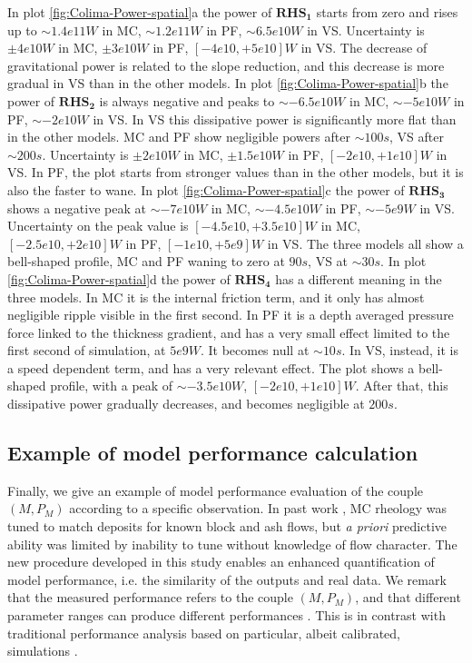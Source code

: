 \documentclass{article}
\begin{document}
In plot \ref{fig:Colima-Power-spatial}a the power of $\boldsymbol{RHS_1}$ starts from zero and rises up to $\sim 1.4e11 W$ in MC, $\sim 1.2e11 W$ in PF, $\sim 6.5e10 W$ in VS. Uncertainty is $\pm 4e10 W$ in MC, $\pm 3e10 W$ in PF, $[-4e10,+5e10] W$ in VS. The decrease of gravitational power is related to the slope reduction, and this decrease is more gradual in VS than in the other models. In plot \ref{fig:Colima-Power-spatial}b the power of  $\boldsymbol{RHS_2}$ is always negative and peaks to $\sim -6.5e10 W$ in MC, $\sim -5e10 W$ in PF, $\sim -2e10 W$ in VS. In VS this dissipative power is significantly more flat than in the other models. MC and PF show negligible powers after $\sim 100 s$, VS after $\sim 200 s$. Uncertainty is $\pm 2e10 W$ in MC, $\pm 1.5e10 W$ in PF, $[-2e10,+1e10] W$ in VS. In PF, the plot starts from stronger values than in the other models, but it is also the faster to wane. In plot \ref{fig:Colima-Power-spatial}c the power of $\boldsymbol{RHS_3}$ shows a negative peak at $\sim -7e10 W$ in MC, $\sim -4.5e10 W$ in PF, $\sim -5e9 W$ in VS. Uncertainty on the peak value is $[-4.5e10,+3.5e10] W$ in MC, $[-2.5e10,+2e10] W$ in PF, $[-1e10,+5e9] W$ in VS. The three models all show a bell-shaped profile, MC and PF waning to zero at $90 s$, VS at $\sim 30 s$. In plot \ref{fig:Colima-Power-spatial}d the power of $\boldsymbol{RHS_4}$ has a different meaning in the three models. In MC it is the internal friction term, and it only has almost negligible ripple visible in the first second. In PF it is a depth averaged pressure force linked to the thickness gradient, and has a very small effect limited to the first second of simulation, at $5e9 W$. It becomes null at $\sim 10 s$. In VS, instead, it is a speed dependent term, and has a very relevant effect. The plot shows a bell-shaped profile, with a peak of $\sim -3.5e10 W$, $[-2e10,+1e10] W$. After that, this dissipative power gradually decreases, and becomes negligible at $200 s$.

\subsection{Example of model performance calculation}
Finally, we give an example of model performance evaluation of the couple $\left(M, P_M\right)$ according to a specific observation. In past work \citep{Patra2005}, MC rheology was tuned to match deposits for known block and ash flows, but {\it a priori} predictive ability was limited by inability to tune without knowledge of flow character. The new procedure developed in this study enables an enhanced quantification of model performance, i.e. the similarity of the outputs and real data. We remark that the measured performance refers to the couple $\left(M, P_M\right)$, and that different parameter ranges can produce different performances \citep{Tierz2016}. This is in contrast with traditional performance analysis based on particular, albeit calibrated, simulations \citep{Charbonnier2012}.
\end{document}

